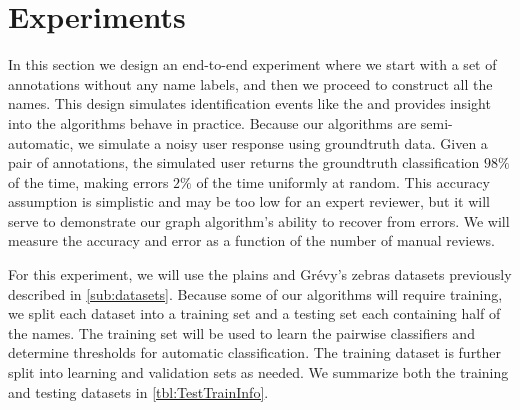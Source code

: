 


\section{Experiments}\label{sec:graphexpt}

    In this section we design an end-to-end experiment where we start with a set of annotations without any name
      labels, and then we proceed to construct all the names.
    This design simulates identification events like the \GZC{} and provides insight into the algorithms behave
      in practice.
    Because our algorithms are semi-automatic, we simulate a noisy user response using groundtruth data.
    Given a pair of annotations, the simulated user returns the groundtruth classification $98\percent$ of the
      time, making errors $2\percent$ of the time uniformly at random.
    This accuracy assumption is simplistic and may be too low for an expert reviewer, but it will serve to
      demonstrate our graph algorithm's ability to recover from errors.
    We will measure the accuracy and error as a function of the number of manual reviews.

    For this experiment, we will use the plains and Grévy's zebras datasets previously described in
      \cref{sub:datasets}.
    Because some of our algorithms will require training, we split each dataset into a training set and a testing
      set each containing half of the names.
    The training set will be used to learn the pairwise classifiers and determine thresholds for automatic
      classification.
    The training dataset is further split into learning and validation sets as needed.
    We summarize both the training and testing datasets in \cref{tbl:TestTrainInfo}.

    \TestTrainDBStats{}

